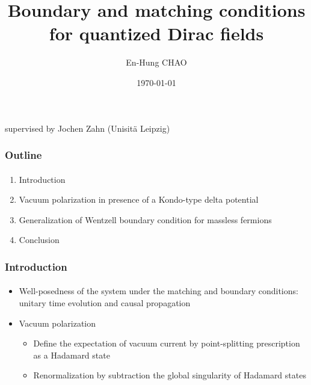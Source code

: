 \documentclass[english]{beamer}
\title{Boundary and matching conditions for quantized Dirac fields}
\author{En-Hung CHAO}
\institute{{\'E}cole Polytechnique \& Universit{\"a}t Leipzig}
\date{\today}
\begin{document}

\begin{frame}
\titlepage%
\centerline{supervised by Jochen Zahn (Unisit{\"a} Leipzig)}
\end{frame}
\begin{frame}
\frametitle{Outline}
\framesubtitle{}

\begin{enumerate}

\item Introduction
\item Vacuum polarization in presence of a Kondo-type delta potential
\item Generalization of Wentzell boundary condition for massless fermions
\item Conclusion

\end{enumerate}

\end{frame}
\begin{frame}
\frametitle{Introduction}
\framesubtitle{}

\begin{itemize}
\item<1-> Well-posedness of the system under the matching and boundary conditions: unitary time evolution and causal propagation
\item<2-> Vacuum polarization 
	\begin{itemize}
		\item Define the expectation of vacuum current by point-splitting prescription as a Hadamard state
		\item Renormalization by subtraction the global singularity of Hadamard states
	\end{itemize}
\end{itemize}

\end{frame}
\end{document}

